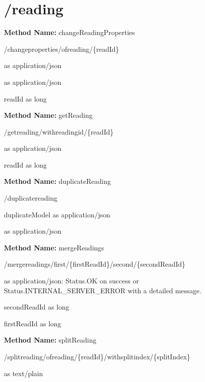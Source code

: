 \section{/reading}
\textbf{Method Name: }changeReadingProperties
\begin{post}
/changeproperties/ofreading/\{readId\}
\end{post}
\begin{request}
 as application/json
\end{request}
\begin{response}
 as application/json
\end{response}
\begin{parameter}
readId as long
\end{parameter}
\textbf{Method Name: }getReading
\begin{get}
/getreading/withreadingid/\{readId\}
\end{get}
\begin{response}
 as application/json
\end{response}
\begin{parameter}
readId as long
\end{parameter}
\textbf{Method Name: }duplicateReading
\begin{post}
/duplicatereading
\end{post}
\begin{request}
duplicateModel as application/json
\end{request}
\begin{response}
 as application/json
\end{response}
\textbf{Method Name: }mergeReadings
\begin{post}
/mergereadings/first/\{firstReadId\}/second/\{secondReadId\}
\end{post}
\begin{response}
 as application/json: Status.OK on success or Status.INTERNAL\_SERVER\_ERROR with a detailed message.
\end{response}
\begin{parameter}
secondReadId as long
\end{parameter}
\begin{parameter}
firstReadId as long
\end{parameter}
\textbf{Method Name: }splitReading
\begin{post}
/splitreading/ofreading/\{readId\}/withsplitindex/\{splitIndex\}
\end{post}
\begin{request}
 as text/plain
\end{request}

